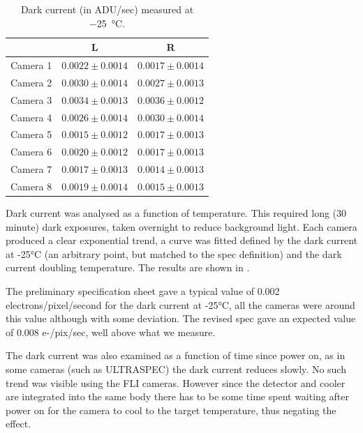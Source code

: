 \begin{colsection}
\begin{colsection}
\begin{table}[t]
    \begin{center}
        \begin{tabular}{c|rr} %
             & \multicolumn{1}{c}{L} & \multicolumn{1}{c}{R} \\
            \midrule
            Camera 1 & $0.0022\pm0.0014$ & $0.0017\pm0.0014$ \\
            Camera 2 & $0.0030\pm0.0014$ & $0.0027\pm0.0013$ \\
            Camera 3 & $0.0034\pm0.0013$ & $0.0036\pm0.0012$ \\
            Camera 4 & $0.0026\pm0.0014$ & $0.0030\pm0.0014$ \\
            Camera 5 & $0.0015\pm0.0012$ & $0.0017\pm0.0013$ \\
            Camera 6 & $0.0020\pm0.0012$ & $0.0017\pm0.0013$ \\
            Camera 7 & $0.0017\pm0.0013$ & $0.0014\pm0.0013$ \\
            Camera 8 & $0.0019\pm0.0014$ & $0.0015\pm0.0013$ \\
        \end{tabular}
    \end{center}
    \caption[TODO]{
        Dark current (in ADU/sec) measured at \SI{-25}{\celsius}.
        }\label{tab:dark}
\end{table}

\citep{dark_current}

Dark current was analysed as a function of temperature. This required long (30 minute) dark exposures, taken overnight to reduce background light. Each camera produced a clear exponential trend, a curve was fitted defined by the dark current at -25°C (an arbitrary point, but matched to the spec definition) and the dark current doubling temperature. The results are shown in .

The preliminary specification sheet gave a typical value of 0.002 electrons/pixel/second for the dark current at -25°C, all the cameras were around this value although with some deviation. The revised spec gave an expected value of 0.008 e-/pix/sec, well above what we measure.

The dark current was also examined as a function of time since power on, as in some cameras (such as ULTRASPEC) the dark current reduces slowly. No such trend was visible using the FLI cameras. However since the detector and cooler are integrated into the same body there has to be some time spent waiting after power on for the camera to cool to the target temperature, thus negating the effect.


\end{colsection}
\end{colsection}
